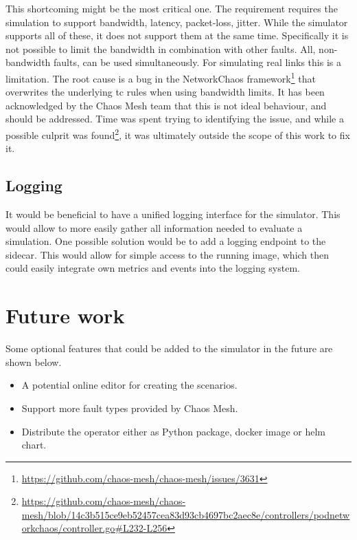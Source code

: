 This shortcoming might be the most critical one. The requirement  requires the simulation to support bandwidth, latency, packet-loss, jitter. While the simulator supports all of these, it does not support them at the same time. Specifically it is not possible to limit the bandwidth in combination with other faults. All, non-bandwidth faults, can be used simultaneously. For simulating real links this is a limitation. The root cause is a bug in the NetworkChaos framework\footnote{\url{https://github.com/chaos-mesh/chaos-mesh/issues/3631}} that overwrites the underlying tc rules when using bandwidth limits. It has been acknowledged by the Chaos Mesh team that this is not ideal behaviour, and should be addressed.
Time was spent trying to identifying the issue, and while a possible culprit was found\footnote{\url{https://github.com/chaos-mesh/chaos-mesh/blob/14c3b515ce9eb52457cea83d93cb4697bc2aec8e/controllers/podnetworkchaos/controller.go\#L232-L256}}, it was ultimately outside the scope of this work to fix it.

\subsection{Logging}

It would be beneficial to have a unified logging interface for the simulator. This would allow to more easily gather all information needed to evaluate a simulation.
One possible solution would be to add a logging endpoint to the sidecar.
This would allow for simple access to the running image, which then could easily integrate own metrics and events into the logging system.

\section{Future work}

Some optional features that could be added to the simulator in the future are shown below.

\begin{itemize}
  \item A potential online editor for creating the scenarios.
  \item Support more fault types provided by Chaos Mesh.
  \item Distribute the operator either as Python package, docker image or helm chart.
\end{itemize}

